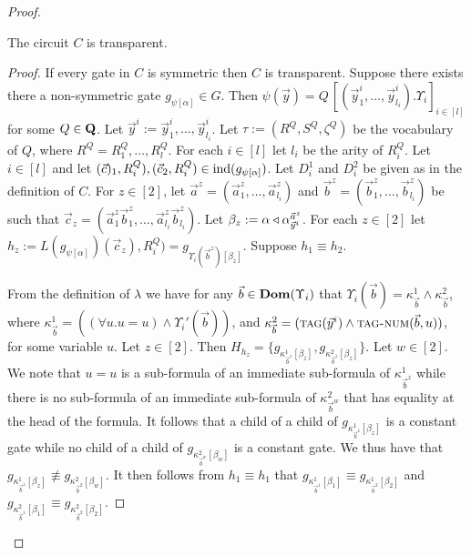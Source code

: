 \documentclass[../main/thesis.tex]{subfiles}
\begin{document}
\begin{proof}
\begin{claim}
  The circuit $C$ is transparent.
  \label{claim:circuit-translation-transparent}
\end{claim}
\begin{proof}
  If every gate in $C$ is symmetric then $C$ is transparent. Suppose there
  exists there a non-symmetric gate $g_{\psi[\alpha]}\in G$. Then $\psi
  (\vec{y}) = Q \, [(\vec{y}^i_1, \ldots, \vec{y}^i_{l_i}) . \Upsilon_i]_{i \in
    [l]}$ for some $Q \in \mathbf{Q}$. Let $\vec{y}^i := \vec{y}^i_1, \ldots,
  \vec{y}^i_{l_i}$. Let $\tau := (R^Q, S^Q, \zeta^Q)$ be the vocabulary of $Q$,
  where $R^Q = {R^Q_1, \ldots, R^Q_l}$. For each $i \in [l]$ let $l_i$ be the
  arity of $R^Q_i$. Let $i \in [l]$ and let $(\vec{c})_1, R^Q_i), (\vec{c}_2,
  R^{Q}_i) \in \text{\upshape ind}(g_{\psi[\alpha]})$. Let $D^1_i$ and $D^2_i$ be given as in
  the definition of $C$. For $z \in [2]$, let $\vec{a}^z = (\vec{a}^z_1, \ldots,
  \vec{a}^z_{l_i})$ and $\vec{b}^z = (\vec{b}^z_1, \ldots, \vec{b}^z_{l_i})$ be
  such that $\vec{c}_z = (\vec{a}^z_1\vec{b}^z_1, \ldots,
  \vec{a}^z_{l_i}\vec{b}^z_{l_i})$. Let $\beta_z :=
  \alpha \triangleleft\alpha^{\vec{a}^z}_{\vec{y}^i}$. For each $z \in [2]$ let $h_z
  := L(g_{\psi[\alpha]})(\vec{c}_z), R^Q_i) =
  g_{\Upsilon_i(\vec{b}^z)[\beta_z]}$. Suppose $h_1 \equiv h_2$.


  From the definition of $\lambda$ we have for any $\vec{b} \in
  \text{\textbf{Dom}}(\Upsilon_i)$ that $\Upsilon_i(\vec{b}) = \kappa^1_{ \vec{b}} \land
  \kappa^2_{\vec{b}}$, where $\kappa^1_{\vec{b}} = ((\forall u. u = u) \land
  \Upsilon_i'(\vec{b}))$, and $\kappa^2_{\vec{b}} = ({\normalfont\textsc{tag}}(\vec{y}^i) \land
  {\normalfont\textsc{tag-num}}(\vec{b}, u))$, for some variable $u$. Let $z \in [2]$. Then
  $H_{h_z} = \{g_{\kappa^1_{\vec{b}^z}[\beta_z]},
  g_{\kappa^2_{\vec{b}^z}[\beta_z]}\}$. Let $w \in [2]$. We note that $u = u$ is
  a sub-formula of an immediate sub-formula of $\kappa^1_{\vec{b}^z}$ while
  there is no sub-formula of an immediate sub-formula of $\kappa^2_{\vec{b}^w}$
  that has equality at the head of the formula. It follows that a child of a
  child of $g_{\kappa^1_{ \vec{b}^z}[\beta_z]}$ is a constant gate while no
  child of a child of $g_{\kappa^2_{ \vec{b}^w}[\beta_w]}$ is a constant gate.
  We thus have that $g_{\kappa^1_{ \vec{b}^z}[\beta_z]} \not\equiv g_{\kappa^2_{
      \vec{b}^2}[\beta_w]}$. It then follows from $h_1 \equiv h_1$ that
  $g_{\kappa^1_{ \vec{b}^1}[\beta_1]} \equiv g_{\kappa^1_{ \vec{b}^2}[\beta_2]}$
  and $g_{\kappa^2_{ \vec{b}^1} [\beta_1]} \equiv g_{\kappa^2_{ \vec{b}^2}
    [\beta_2]}$.


\end{proof}
\end{proof}
\end{document}
